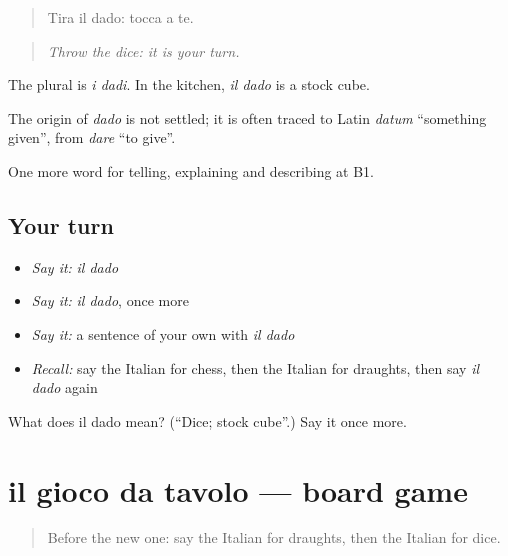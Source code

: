 \begin{quote}
Tira il dado: tocca a te.
\end{quote}

\begin{quote}
\emph{Throw the dice: it is your turn.}
\end{quote}

The plural is \emph{i dadi}. In the kitchen, \emph{il dado} is a stock cube.

\begin{cousinweb}
The origin of \emph{dado} is not settled; it is often traced to Latin \emph{datum} \textquotedblleft{}something given\textquotedblright{}, from \emph{dare} \textquotedblleft{}to give\textquotedblright{}.
\end{cousinweb}

\begin{grammarlens}[title={What you've built}]
One more word for telling, explaining and describing at B1.
\end{grammarlens}

\subsection*{Your turn}
\begin{itemize}
\raggedright
  \item \emph{Say it:} \emph{il dado}
  \item \emph{Say it:} \emph{il dado}, once more
  \item \emph{Say it:} a sentence of your own with \emph{il dado}
  \item \emph{Recall:} say the Italian for chess, then the Italian for draughts, then say \emph{il dado} again
\end{itemize}

\begin{tcolorbox}[breakable,colback=teal!4,colframe=teal!35!black,title={Before you move on}]
What does il dado mean? (\textquotedblleft{}Dice; stock cube\textquotedblright{}.) Say it once more.
\end{tcolorbox}
\section[il gioco da tavolo]{il gioco da tavolo — board game}

\label{lesson:IT-C503-gioco-da-tavolo}



\begin{quote}
Before the new one: say the Italian for draughts, then the Italian for dice.
\end{quote}

